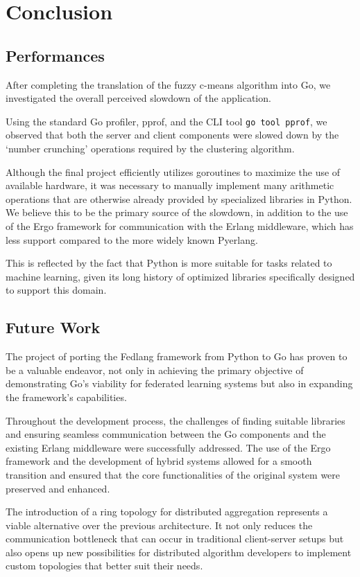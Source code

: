 \chapter{Conclusion}
\section{Performances}
After completing the translation of the fuzzy c-means algorithm into Go, we investigated the overall perceived slowdown of the application. 

Using the standard Go profiler, pprof, and the CLI tool \texttt{go tool pprof}, we observed that both the server and client components were slowed down by the `number crunching' operations required by the clustering algorithm. 

Although the final project efficiently utilizes goroutines to maximize the use of available hardware, it was necessary to manually implement many arithmetic operations that are otherwise already provided by specialized libraries in Python. 
We believe this to be the primary source of the slowdown, in addition to the use of the Ergo framework for communication with the Erlang middleware, which has less support compared to the more widely known Pyerlang. 

This is reflected by the fact that Python is more suitable for tasks related to machine learning, given its long history of optimized libraries specifically designed to support this domain.
\section{Future Work}

The project of porting the Fedlang framework from Python to Go has proven to be a valuable endeavor, not only in achieving the primary objective of demonstrating Go's viability for federated learning systems but also in expanding the framework's capabilities. 

Throughout the development process, the challenges of finding suitable libraries and ensuring seamless communication between the Go components and the existing Erlang middleware were successfully addressed. The use of the Ergo framework and the development of hybrid systems allowed for a smooth transition and ensured that the core functionalities of the original system were preserved and enhanced.

The introduction of a ring topology for distributed aggregation represents a viable alternative over the previous architecture. It not only reduces the communication bottleneck that can occur in traditional client-server setups but also opens up new possibilities for distributed algorithm developers to implement custom topologies that better suit their needs.

